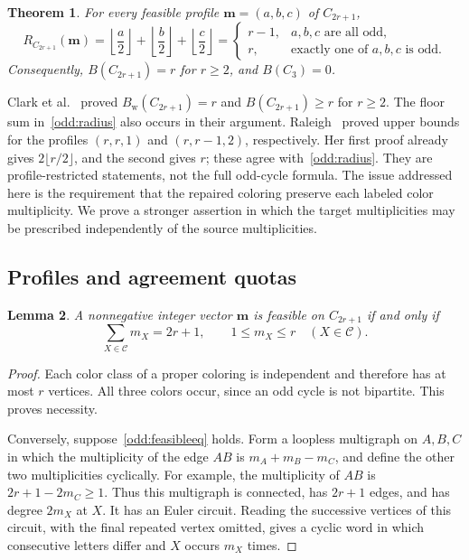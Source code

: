 \documentclass[11pt,reqno]{amsart}
\numberwithin{equation}{section}
\newtheorem{theorem}{Theorem}[section]
\newtheorem{lemma}[theorem]{Lemma}
\theoremstyle{definition}
\theoremstyle{remark}
\begin{document}
\begin{theorem}\label{odd:main}
For every feasible profile $\mathbf m=(a,b,c)$ of $C_{2r+1}$,
\begin{equation}\label{odd:radius}
R_{C_{2r+1}}(\mathbf m)
=\left\lfloor\frac a2\right\rfloor
 +\left\lfloor\frac b2\right\rfloor
 +\left\lfloor\frac c2\right\rfloor
=\begin{cases}
r-1,&a,b,c\text{ are all odd},\\
r,&\text{exactly one of }a,b,c\text{ is odd}.
\end{cases}
\end{equation}
Consequently,
$B(C_{2r+1})=r$ for $r\ge2$, and $B(C_3)=0$.
\end{theorem}

Clark et al.~\cite[Proposition~3.5 and Corollary~3.6]{clark2006}
proved $B_{\mathrm w}(C_{2r+1})=r$ and $B(C_{2r+1})\ge r$ for $r\ge2$.
The floor sum in~\eqref{odd:radius} also occurs in their argument.
Raleigh~\cite[Theorems~7--8]{raleigh2018} proved upper bounds for the
profiles $(r,r,1)$ and $(r,r-1,2)$, respectively. Her first proof
already gives $2\lfloor r/2\rfloor$, and the second gives $r$;
these agree with~\eqref{odd:radius}. They are profile-restricted
statements, not the full odd-cycle formula.
The issue addressed here is the requirement that the repaired coloring
preserve each labeled color multiplicity. We prove a stronger assertion
in which the target multiplicities may be prescribed independently of
the source multiplicities.

\subsection{Profiles and agreement quotas}

\begin{lemma}\label{odd:feasible}
A nonnegative integer vector $\mathbf m$ is feasible on $C_{2r+1}$
if and only if
\begin{equation}\label{odd:feasibleeq}
\sum_{X\in\mathcal C}m_X=2r+1,
\qquad 1\le m_X\le r\quad(X\in\mathcal C).
\end{equation}
\end{lemma}
\begin{proof}
Each color class of a proper coloring is independent and therefore has
at most $r$ vertices. All three colors occur, since an odd cycle is not
bipartite. This proves necessity.

Conversely, suppose~\eqref{odd:feasibleeq} holds. Form a loopless
multigraph on $A,B,C$ in which the multiplicity of the edge $AB$ is
$m_A+m_B-m_C$, and define the other two multiplicities cyclically.
For example, the multiplicity of $AB$ is $2r+1-2m_C\ge1$.
Thus this multigraph is connected, has $2r+1$ edges, and has degree
$2m_X$ at $X$. It has an Euler circuit. Reading the successive vertices
of this circuit, with the final repeated vertex omitted, gives a cyclic
word in which consecutive letters differ and $X$ occurs $m_X$ times.
\end{proof}
\end{document}
